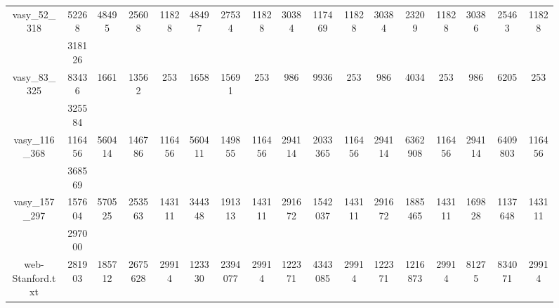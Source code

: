 \documentclass[../master/master.tex]{subfiles}
\begin{document}
\begin{figure}
\begin{adjustbox}{angle=90}
\begin{tabular}{ |c|c||c|c|c||c|c|c||c|c|c||c|c|c||c|c|c|| }
\hline
\multirow{2}{3.6em}{vasy\_52\_318} & 52268 & \multirow{2}{3.6em}{48495} & \multirow{2}{3.6em}{25608} & \multirow{2}{3.6em}{11828} & \multirow{2}{3.6em}{48497} & \multirow{2}{3.6em}{27534} & \multirow{2}{3.6em}{11828} & \multirow{2}{3.6em}{30384} & \multirow{2}{3.6em}{117469} & \multirow{2}{3.6em}{11828} & \multirow{2}{3.6em}{30384} & \multirow{2}{3.6em}{23209} & \multirow{2}{3.6em}{11828} & \multirow{2}{3.6em}{30386} & \multirow{2}{3.6em}{25463} & \multirow{2}{3.6em}{11828} \\
\cline{2-2}
 & 318126  &  &  &  &  &  &  &  &  &  &  &  &  &  &  &  \\
\hline
\multirow{2}{3.6em}{vasy\_83\_325} & 83436 & \multirow{2}{3.6em}{1661} & \multirow{2}{3.6em}{13562} & \multirow{2}{3.6em}{253} & \multirow{2}{3.6em}{1658} & \multirow{2}{3.6em}{15691} & \multirow{2}{3.6em}{253} & \multirow{2}{3.6em}{986} & \multirow{2}{3.6em}{9936} & \multirow{2}{3.6em}{253} & \multirow{2}{3.6em}{986} & \multirow{2}{3.6em}{4034} & \multirow{2}{3.6em}{253} & \multirow{2}{3.6em}{986} & \multirow{2}{3.6em}{6205} & \multirow{2}{3.6em}{253} \\
\cline{2-2}
 & 325584  &  &  &  &  &  &  &  &  &  &  &  &  &  &  &  \\
\hline
\multirow{2}{3.6em}{vasy\_116\_368} & 116456 & \multirow{2}{3.6em}{560414} & \multirow{2}{3.6em}{146786} & \multirow{2}{3.6em}{116456} & \multirow{2}{3.6em}{560411} & \multirow{2}{3.6em}{149855} & \multirow{2}{3.6em}{116456} & \multirow{2}{3.6em}{294114} & \multirow{2}{3.6em}{2033365} & \multirow{2}{3.6em}{116456} & \multirow{2}{3.6em}{294114} & \multirow{2}{3.6em}{6362908} & \multirow{2}{3.6em}{116456} & \multirow{2}{3.6em}{294114} & \multirow{2}{3.6em}{6409803} & \multirow{2}{3.6em}{116456} \\
\cline{2-2}
 & 368569  &  &  &  &  &  &  &  &  &  &  &  &  &  &  &  \\
\hline
\multirow{2}{3.6em}{vasy\_157\_297} & 157604 & \multirow{2}{3.6em}{570525} & \multirow{2}{3.6em}{253563} & \multirow{2}{3.6em}{143111} & \multirow{2}{3.6em}{344348} & \multirow{2}{3.6em}{191313} & \multirow{2}{3.6em}{143111} & \multirow{2}{3.6em}{291672} & \multirow{2}{3.6em}{1542037} & \multirow{2}{3.6em}{143111} & \multirow{2}{3.6em}{291672} & \multirow{2}{3.6em}{1885465} & \multirow{2}{3.6em}{143111} & \multirow{2}{3.6em}{169828} & \multirow{2}{3.6em}{1137648} & \multirow{2}{3.6em}{143111} \\
\cline{2-2}
 & 297000  &  &  &  &  &  &  &  &  &  &  &  &  &  &  &  \\
\hline
\multirow{2}{3.6em}{web-Stanford.txt} & 281903 & \multirow{2}{3.6em}{185712} & \multirow{2}{3.6em}{2675628} & \multirow{2}{3.6em}{29914} & \multirow{2}{3.6em}{123330} & \multirow{2}{3.6em}{2394077} & \multirow{2}{3.6em}{29914} & \multirow{2}{3.6em}{122371} & \multirow{2}{3.6em}{4343085} & \multirow{2}{3.6em}{29914} & \multirow{2}{3.6em}{122371} & \multirow{2}{3.6em}{1216873} & \multirow{2}{3.6em}{29914} & \multirow{2}{3.6em}{81275} & \multirow{2}{3.6em}{834071} & \multirow{2}{3.6em}{29914} \\

\end{tabular}
\end{adjustbox}
\end{figure}
\end{document}
